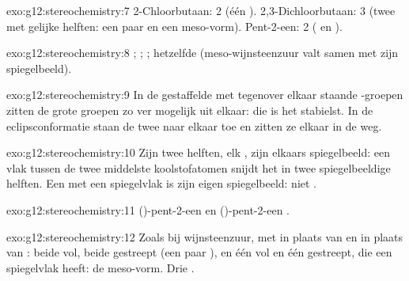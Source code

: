\begin{solution}{exo:g12:stereochemistry:7}
2-Chloorbutaan: 2 (één ). 2,3-Dichloorbutaan: 3
(twee  met gelijke helften: een paar
 en een meso-vorm). Pent-2-een: 2 ( en ).
\end{solution}

\begin{solution}{exo:g12:stereochemistry:8}
; ; ; hetzelfde 
(meso-wijnsteenzuur valt samen met zijn spiegelbeeld).
\end{solution}

\begin{solution}{exo:g12:stereochemistry:9}
In de gestaffelde  met tegenover elkaar staande
-groepen zitten de grote groepen zo ver mogelijk uit elkaar: die
is het stabielst. In de eclipsconformatie staan de twee  naar
elkaar toe en zitten ze elkaar in de weg.
\end{solution}

\begin{solution}{exo:g12:stereochemistry:10}
Zijn twee helften, elk , zijn elkaars spiegelbeeld: een
vlak tussen de twee middelste koolstofatomen snijdt het  in twee
spiegelbeeldige helften. Een  met een spiegelvlak is zijn eigen
spiegelbeeld: niet .
\end{solution}

\begin{solution}{exo:g12:stereochemistry:11}
()-pent-2-een 
en ()-pent-2-een .
\end{solution}

\begin{solution}{exo:g12:stereochemistry:12}
Zoals bij wijnsteenzuur, met  in plaats van  en 
in plaats van : beide  vol, beide gestreept (een paar
), en één vol en één gestreept, die een spiegelvlak heeft:
de meso-vorm. Drie .
\end{solution}


